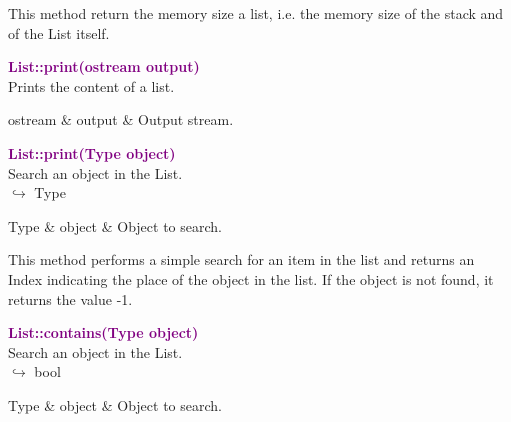 This method return the memory size a list, i.e. the memory size of the stack and of the List itself.

\textcolor{purple}{\textbf{List::print(ostream output)}}\label{List::print(ostream output)}\\
Prints the content of a list.

\begin{tcolorbox}[width=\textwidth,myArgs,tabularx={ll|R}]
ostream & output & Output stream.
\end{tcolorbox}


\textcolor{purple}{\textbf{List::print(Type object)}}\label{List::print(Type object)}\\
Search an object in the List.\\ \hspace*{10mm}$\hookrightarrow$ Type

\begin{tcolorbox}[width=\textwidth,myArgs,tabularx={ll|R}]
Type & object & Object to search.
\end{tcolorbox}

This method performs a simple search for an item in the list and returns an Index indicating the place of the object in the list.
If the object is not found, it returns the value -1.

\textcolor{purple}{\textbf{List::contains(Type object)}}\label{List::contains(Type object)}\\
Search an object in the List.\\ \hspace*{10mm}$\hookrightarrow$ bool

\begin{tcolorbox}[width=\textwidth,myArgs,tabularx={ll|R}]
Type & object & Object to search.
\end{tcolorbox}

